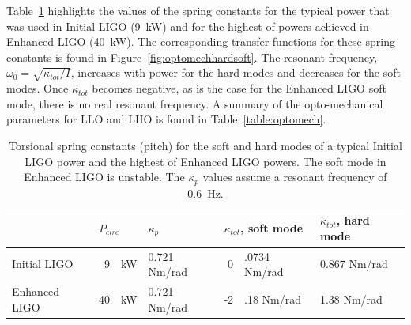 Table~\ref{table:k_tot} highlights the values of the spring constants
for the typical power that was used in Initial LIGO (9~kW) and for the
highest of powers achieved in Enhanced LIGO (40~kW). The corresponding
transfer functions for these spring constants is found in
Figure~\ref{fig:optomechhardsoft}. The resonant frequency, $\omega_0 =
\sqrt{\kappa_{tot}/I}$, increases with power for the hard modes and
decreases for the soft modes. Once $\kappa_{tot}$ becomes negative, as
is the case for the Enhanced LIGO soft mode, there is no real resonant
frequency. A summary of the opto-mechanical parameters for LLO and LHO
is found in Table~\ref{table:optomech}.

\begin{table}
\centering
\caption[Torsional spring constants for the soft and hard cavity
modes]{Torsional spring constants (pitch) for the soft and hard modes
  of a typical Initial LIGO power and the highest of Enhanced LIGO
  powers. The soft mode in Enhanced LIGO is unstable. The $\kappa_p$
  values assume a resonant frequency of 0.6~Hz.}
\begin{tabular}{l r@{ }l l r@{}l l}
\hline
 & \multicolumn{2}{l}{$P_{circ}$} & $\kappa_{p}$ & \multicolumn{2}{l}{$\kappa_{tot}$, soft mode} &
 $\kappa_{tot}$, hard mode\\
\hline
Initial LIGO & 9& kW & 0.721 Nm/rad& 0&.0734 Nm/rad & 0.867 Nm/rad\\
Enhanced LIGO & 40& kW & 0.721 Nm/rad& -2&.18 Nm/rad & 1.38 Nm/rad\\
\hline
\end{tabular}
\label{table:k_tot}
\end{table}

